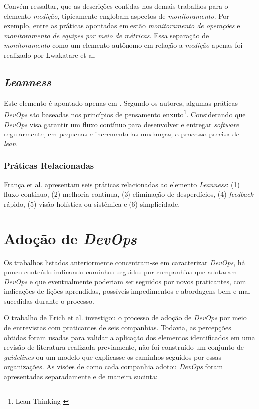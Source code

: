 Convém ressaltar, que as descrições contidas nos demais trabalhos para o
elemento \emph{medição}, tipicamente englobam aspectos de \emph{monitoramento}.
Por exemplo, entre as práticas apontadas em \cite{characterizing_devops} estão
\emph{monitoramento de operações} e \emph{monitoramento de equipes por meio de
métricas}. Essa separação de \emph{monitoramento} como um elemento autônomo em
relação a \emph{medição} apenas foi realizado por Lwakatare et al.

\subsection{\textit{Leanness}}

Este elemento é apontado apenas em \cite{characterizing_devops}. Segundo os
autores, algumas práticas \textit{DevOps} são baseadas nos princípios de
pensamento enxuto\footnote{Lean Thinking \cite{lean_thinking}}. Considerando
que \textit{DevOps} visa garantir um fluxo contínuo para desenvolver e entregar
\textit{software} regularmente, em pequenas e incrementadas mudanças, o processo
precisa de \textit{lean}.

\subsubsection{Práticas Relacionadas}
França et al. \cite{characterizing_devops} apresentam seis práticas
relacionadas ao elemento \textit{Leanness}: (1) fluxo contínuo, (2) melhoria
contínua, (3) eliminação de desperdícios, (4) \textit{feedback} rápido, (5)
visão holística ou sistêmica e (6) simplicidade.

\section{Adoção de \textit{DevOps}}\label{secao_adocao_devops}

Os trabalhos listados anteriormente concentram-se em caracterizar
\textit{DevOps}, há pouco conteúdo indicando caminhos seguidos por companhias
que adotaram \textit{DevOps} e que eventualmente poderiam ser seguidos por
novos praticantes, com indicações de lições aprendidas, possíveis impedimentos
e abordagens bem e mal sucedidas durante o processo.

O trabalho de Erich et al. \cite{qualitative_devops_journalsw_17} investigou
o processo de adoção de \textit{DevOps} por meio de entrevistas com praticantes
de seis companhias. Todavia, as percepções obtidas foram usadas para validar
a aplicação dos elementos identificados em uma revisão de literatura realizada
previamente, não foi construído um conjunto de \textit{guidelines} ou um modelo
que explicasse os caminhos seguidos por essas organizações. As visões de como
cada companhia adotou \textit{DevOps} foram apresentadas separadamente e de
maneira sucinta:


